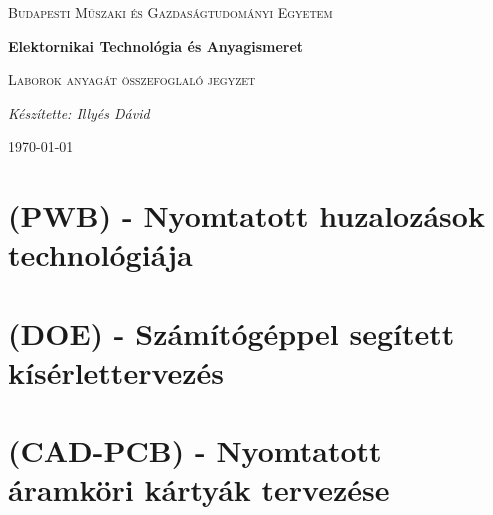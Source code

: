 \documentclass[12pt]{article}
\begin{document}
\begin{titlepage}
	\centering \vfill
	{\textsc{Budapesti Műszaki és Gazdaságtudományi Egyetem} \par} \vspace{7cm}
	{\huge\bfseries Elektornikai Technológia és Anyagismeret\par} \vspace{0.5cm}
	{\large \textsc{Laborok anyagát összefoglaló jegyzet}\par} \vspace{1.5cm}
	{\Large\itshape Készítette: Illyés Dávid\par} \vfill

	\noindent{}
	
	\vfill {\large \today\par}
\end{titlepage} 
\tableofcontents
{}

	\section{(PWB) - Nyomtatott huzalozások technológiája}

		
	









	\section{(DOE) - Számítógéppel segített kísérlettervezés}

		








	\section{(CAD-PCB) - Nyomtatott áramköri kártyák tervezése}

		

			
\end{document}

